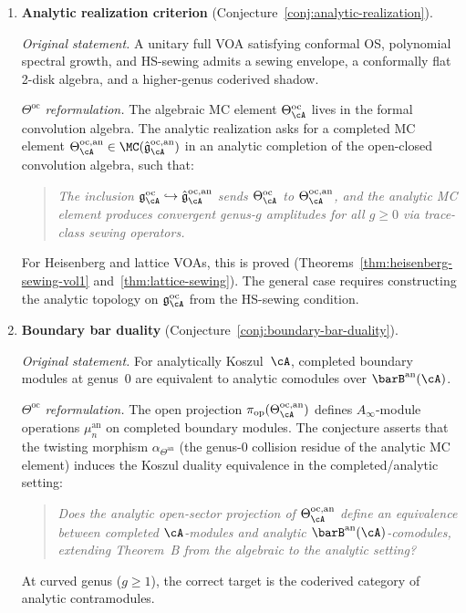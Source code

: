 \begin{enumerate}[resume, label=\textup{(\arabic*)}]

\item \textbf{Analytic realization criterion}
 (Conjecture~\ref{conj:analytic-realization}).

 \smallskip\noindent
 \emph{Original statement.}
 A unitary full VOA satisfying conformal OS, polynomial spectral
 growth, and HS-sewing admits a sewing envelope, a conformally
 flat 2-disk algebra, and a higher-genus coderived shadow.

 \smallskip\noindent
 \emph{$\Theta^{\mathrm{oc}}$ reformulation.}
 The algebraic MC element $\Theta^{\mathrm{oc}}_\cA$ lives in
 the formal convolution algebra. The analytic realization asks
 for a completed MC element
 $\Theta^{\mathrm{oc}, \mathrm{an}}_\cA
 \in \MC(\hat{\mathfrak{g}}{}^{\mathrm{oc},\mathrm{an}}_\cA)$
 in an analytic completion of the open-closed convolution algebra,
 such that:
 \begin{quote}
 \emph{The inclusion
 $\mathfrak{g}^{\mathrm{oc}}_\cA \hookrightarrow
 \hat{\mathfrak{g}}{}^{\mathrm{oc},\mathrm{an}}_\cA$
 sends $\Theta^{\mathrm{oc}}_\cA$ to
 $\Theta^{\mathrm{oc},\mathrm{an}}_\cA$, and the analytic
 MC element produces convergent genus-$g$ amplitudes for all
 $g \geq 0$ via trace-class sewing operators.}
 \end{quote}
 For Heisenberg and lattice VOAs, this is proved
 (Theorems~\ref{thm:heisenberg-sewing-vol1}
 and~\ref{thm:lattice-sewing}). The general case requires
 constructing the analytic topology on
 $\mathfrak{g}^{\mathrm{oc}}_\cA$ from the HS-sewing condition.

\item \textbf{Boundary bar duality}
 (Conjecture~\ref{conj:boundary-bar-duality}).

 \smallskip\noindent
 \emph{Original statement.}
 For analytically Koszul~$\cA$, completed boundary modules at
 genus~$0$ are equivalent to analytic comodules over
 $\barB^{\mathrm{an}}(\cA)$.

 \smallskip\noindent
 \emph{$\Theta^{\mathrm{oc}}$ reformulation.}
 The open projection
 $\pi_{\mathrm{op}}(\Theta^{\mathrm{oc},\mathrm{an}}_\cA)$
 defines $A_\infty$-module operations
 $\mu_n^{\mathrm{an}}$ on completed boundary modules.
 The conjecture asserts that the twisting morphism
 $\alpha_{\Theta^{\mathrm{an}}}$
 (the genus-$0$ collision residue of the analytic MC element)
 induces the Koszul duality equivalence in the completed/analytic
 setting:
 \begin{quote}
 \emph{Does the analytic open-sector projection of
 $\Theta^{\mathrm{oc},\mathrm{an}}_\cA$ define an equivalence
 between completed $\cA$-modules and analytic
 $\barB^{\mathrm{an}}(\cA)$-comodules, extending Theorem~B
 from the algebraic to the analytic setting?}
 \end{quote}
 At curved genus ($g \geq 1$), the correct target is the
 coderived category of analytic contramodules.


\end{enumerate}
